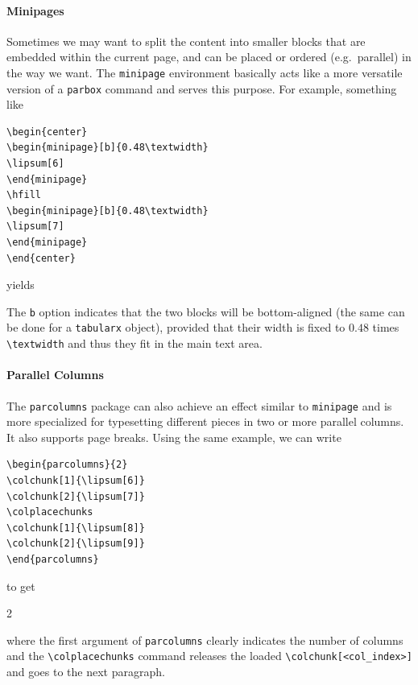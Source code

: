 \paragraph{Minipages}
Sometimes we may want to split the content into smaller blocks that are embedded within the current page, and can be placed or ordered (e.g.\ parallel) in the way we want. The \verb|minipage| environment basically acts like a more versatile version of a \verb|parbox| command and serves this purpose. For example, something like
\begin{lstlisting}
\begin{center}
\begin{minipage}[b]{0.48\textwidth}
\lipsum[6]
\end{minipage}
\hfill
\begin{minipage}[b]{0.48\textwidth}
\lipsum[7]
\end{minipage}    
\end{center}      
\end{lstlisting}
yields \par
\begin{center}
\begin{minipage}[b]{0.48\textwidth}
\lipsum[6]
\end{minipage}
\hfill
\begin{minipage}[b]{0.48\textwidth}
\lipsum[7]
\end{minipage}    
\end{center}
The \verb|b| option indicates that the two blocks will be bottom-aligned (the same can be done for a \texttt{tabularx} object), provided that their width is fixed to $0.48$ times \texttt{\textbackslash textwidth} and thus they fit in the main text area.

\paragraph{Parallel Columns} The \verb|parcolumns| package can also achieve an effect similar to \verb|minipage| and is more specialized for typesetting different pieces in two or more parallel columns. It also supports page breaks. Using the same example, we can write
\begin{lstlisting}
\begin{parcolumns}{2}
\colchunk[1]{\lipsum[6]}
\colchunk[2]{\lipsum[7]}
\colplacechunks
\colchunk[1]{\lipsum[8]}
\colchunk[2]{\lipsum[9]}
\end{parcolumns}
\end{lstlisting}
to get\\
\begin{parcolumns}{2}
\colchunk[1]{\lipsum[6]}
\colchunk[2]{\lipsum[7]}
\colplacechunks
\colchunk[1]{\lipsum[8]}
\colchunk[2]{\lipsum[9]}
\end{parcolumns}
where the first argument of \texttt{parcolumns} clearly indicates the number of columns and the \texttt{\textbackslash colplacechunks} command releases the loaded \texttt{\textbackslash colchunk[<col\allowbreak\_index>]} and goes to the next paragraph.

